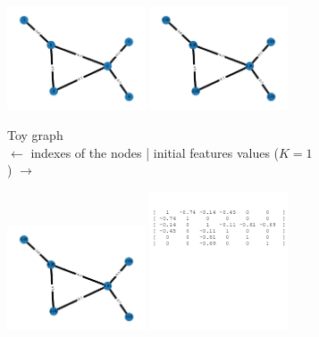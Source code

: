 \documentclass[sigconf]{acmart}
\begin{document}
 \begin{figure}
    \centering
    \begin{subfigure}{0.45\textwidth}
        \centering
        \includegraphics[width=0.45\textwidth]{figures/toy_graph_init.png}
        \includegraphics[width=0.45\textwidth]{figures/toy_graph_conv_K1.png}
        \caption{Toy graph\\ $\leftarrow$ indexes of the nodes | initial features values ($K=1$) $\rightarrow$}
    \end{subfigure}
    \hfill
    \begin{subfigure}{0.45\textwidth}
        \centering
        \includegraphics[width=0.45\textwidth]{figures/toy_graph_conv_K2.png}
        \includegraphics[width=0.45\textwidth]{figures/lap1.png}

\end{subfigure}
\end{figure}
\end{document}
